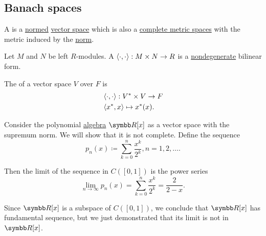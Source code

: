 \subsection{Banach spaces}\label{subsec:banach_spaces}

\begin{Definition}\label{def:banach_space}
  A  is a \hyperref[def:norm]{normed} \hyperref[def:vector_space]{vector space} which is also a \hyperref[def:complete_metric_space]{complete metric spaces} with the metric induced by the \hyperref[def:norm_induced_metric]{norm}.
\end{Definition}

\begin{Definition}\label{def:topological_duality_pairing}
  Let \( M \) and \( N \) be left \( R \)-modules. A  \( \left\langle \cdot, \cdot \right\rangle: M \times N \to R \) is a \hyperref[def:nondegenerate_bilinear_form]{nondegenerate} bilinear form.

  The  of a vector space \( V \) over \( F \) is
  \begin{align*}
    &\left\langle \cdot, \cdot \right\rangle: V^* \times V \to F \\
    &\left\langle x^*, x \right\rangle \mapsto x^*(x).
  \end{align*}
\end{Definition}

\begin{Example}\label{ex:noncomplete_normed_space}\cite{MathCounterExamples:noncomplete_normed_space}
  Consider the polynomial \hyperref[def:algebra_of_polynomials]{algebra} \( \BR[x] \) as a vector space with the supremum norm. We will show that it is not complete. Define the sequence
  \begin{equation*}
    p_n(x) \coloneqq \sum_{k=0}^n \frac{x^k} {2^k}, n = 1, 2, \ldots.
  \end{equation*}

  Then the limit of the sequence in \( C([0, 1]) \) is the power series
  \begin{equation*}
    \lim_{n \to \infty} p_n(x)
    =
    \sum_{k=0}^n \frac{x^k} {2^k}
    =
    \frac 2 {2 - x}.
  \end{equation*}

  Since \( \BR[x] \) is a subspace of \( C([0, 1]) \), we conclude that \( \BR[x] \) has fundamental sequence, but we just demonstrated that its limit is not in \( \BR[x] \).
\end{Example}

